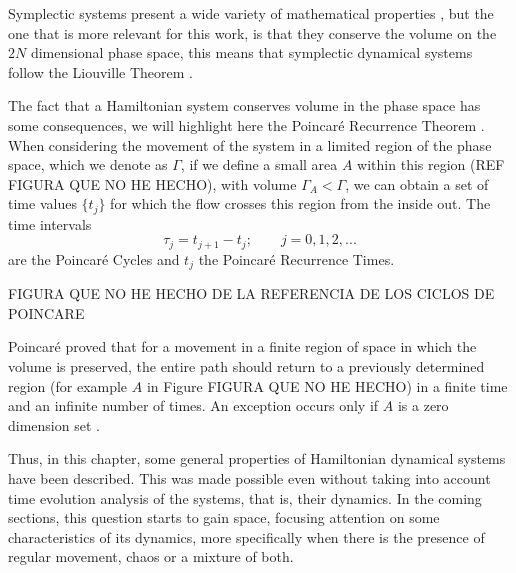 Symplectic systems present a wide variety of mathematical properties \cite{arnold1968probemes}, but the one that is more relevant for this work, is that they conserve the volume on the $2N$ dimensional phase space, this means that symplectic dynamical systems follow the Liouville Theorem \cite{ott_chaos_2002}.\par

The fact that a Hamiltonian system conserves volume in the phase space has some consequences, we will highlight here the Poincaré Recurrence Theorem \cite{zaslavsky2005hamiltonian} \cite{zaslavsky2007physics}. When considering the movement of the system in a limited region of the phase space, which we denote as $\Gamma$, if we define a small area $A$ within this region (REF FIGURA QUE NO HE HECHO), with volume $\Gamma_A < \Gamma$, we can obtain a set of time values $\{ t_j\}$ for which the flow crosses this region from the inside out. The time intervals
\begin{equation}
\tau_j=t_{j+1}-t_j;\qquad j=0,1,2,...
\end{equation}
are the Poincaré Cycles and $t_j$ the Poincaré Recurrence Times. \par



FIGURA QUE NO HE HECHO DE LA REFERENCIA DE LOS CICLOS DE POINCARE\par

Poincaré proved that for a movement in a finite region of space in which the volume is preserved, the entire path should return to a previously determined region (for example $A$ in Figure FIGURA QUE NO HE HECHO) in a finite time and an infinite number of times. An exception occurs only if $A$ is a zero dimension set \cite{zaslavsky2005hamiltonian} \cite{zaslavsky2007physics} \cite{xavier2015banhos}.\par 

Thus, in this chapter, some general properties of Hamiltonian dynamical systems have been described. This was made possible even without taking into account time evolution analysis of the systems, that is, their dynamics. In the coming sections, this question starts to gain space, focusing attention on some characteristics of its dynamics, more specifically when there is the presence of regular movement, chaos or a mixture of both.



